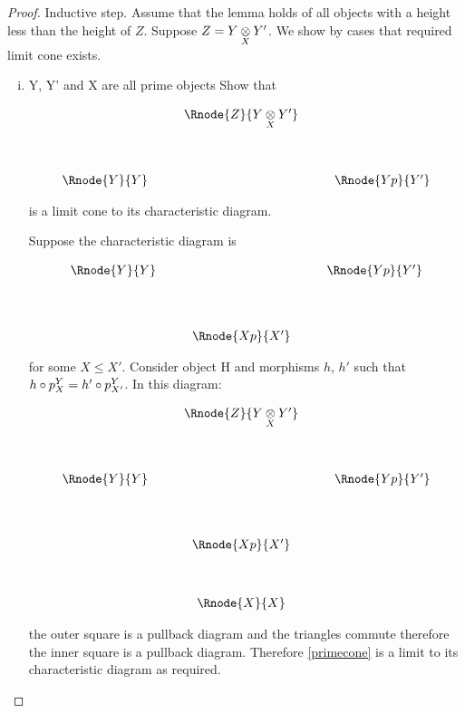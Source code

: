 \documentclass[10pt,a4paper]{scrartcl}
\begin{document}
\begin{proof}
Inductive step. Assume  that the lemma holds of all objects with a height less than the height of $Z$. Suppose $Z=\crossx{Y}{Y'}{X}$. We show by cases that required limit cone exists.
\begin{enumerate}[(i)]
\item{Y, Y' and X are all prime objects}
Show that
\begin{center}
\begin{displaymath}
\begin{array}{cp{0.3cm}c         p{0.3cm}  c }
               & & \Rnode{Z}{\crossx{Y}{Y'}{X}} & &     \\ [1.4cm]
\Rnode{Y}{Y}   &&                               & & \Rnode{Yp}{Y'}  
\end{array}
\end{displaymath}
\end{center}

is a limit cone to its characteristic diagram.

Suppose the characteristic diagram is 
\begin{center}
\begin{displaymath}
\begin{array}{cp{0.3cm}c    p{0.3cm}  c }
\Rnode{Y}{Y}   &&                               & & \Rnode{Yp}{Y'}   \\ [1.4cm]
               & & \Rnode{Xp}{X'} & &   
\end{array}
\end{displaymath}
\end{center}
for some $X \leq X'$. Consider object H and morphisms $h$, $h'$ such that $h \circ \pc{Y}{X} = h' \circ \pc{Y}{X'}$. In this diagram:

\begin{center}
\begin{displaymath}
\begin{array}{cp{0.3cm}c    p{0.3cm}  c }
               & & \Rnode{Z}{\crossx{Y}{Y'}{X}} & &     \\ [1.4cm]
\Rnode{Y}{Y}   &&                               & & \Rnode{Yp}{Y'}   \\ [1.4cm]
               & & \Rnode{Xp}{X'} & &                                \\ [1.2cm]
							 & & \Rnode{X}{X} & &   
\end{array}
\end{displaymath}
\end{center}
the outer square is a pullback diagram and the triangles commute therefore the inner square is  a pullback diagram. Therefore \ref{primecone} is a limit to its characteristic diagram as required.


\end{enumerate}
\end{proof}
\end{document}
